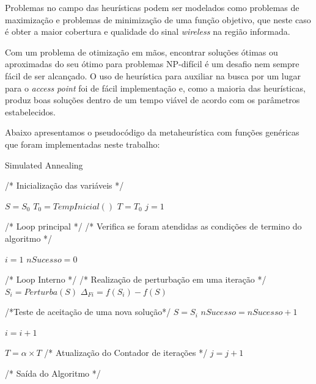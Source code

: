 \documentclass[
	12pt,				%
	twoside,			%
	a4paper,			%
	english,			%
	french,				%
	spanish,			%
	brazil				%
	]{abntex2}
\begin{document}
Problemas no campo das heurísticas podem ser modelados como problemas de
maximização e problemas de minimização de uma função objetivo, que neste
caso é obter a maior cobertura e qualidade do sinal \emph{wireless} na
região informada.

Com um problema de otimização em mãos, encontrar soluções ótimas ou
aproximadas do seu ótimo para problemas NP-difícil é um desafio nem
sempre fácil de ser alcançado. O uso de heurística para auxiliar na
busca por um lugar para o \emph{access point} foi de fácil implementação
e, como a maioria das heurísticas, produz boas soluções dentro de um
tempo viável de acordo com os parâmetros estabelecidos.

Abaixo apresentamos o pseudocódigo da metaheurística com funções
genéricas que foram implementadas neste trabalho:

\begin{algorithm}
    \caption{Simulated Annealing}\label{sa}
    \begin{algorithmic}[1]
        
        \State/* Inicialização das variáveis */
        
        \State $S = S_{0}$
        \State $T_{0} = TempInicial()$
        \State $T = T_{0}$
        \State $j = 1$
        
        \State /* Loop principal */
        \State /* Verifica se foram atendidas as condições de termino do algoritmo */
        \Repeat
        
        \State $i = 1$
        \State $nSucesso = 0$
        
        \State /* Loop Interno */
        \State /* Realização de perturbação em uma iteração */
            \Repeat
                \State $S_{i} = Perturba(S)$
                \State $\Delta_{Fi} = f(S_{i}) - f(S)$
                
                \State /*Teste de aceitação de uma nova solução*/
                    \State $S = S_{i}$
                    \State $nSucesso = nSucesso + 1$
                \EndIf
            
            \State $i = i + 1$
        
           \State $T = \alpha \times T$
           \State /* Atualização do Contador de iterações */
           \State $j = j + 1$
        
        
        \State /* Saída do Algoritmo */
        \State {}
        
        \EndProcedure
    \end{algorithmic}
\end{algorithm}
\end{document}
